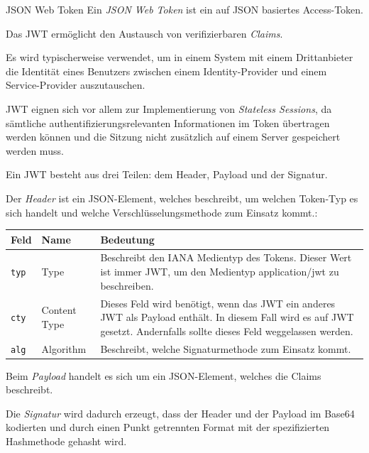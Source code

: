 \begin{defi}{JSON Web Token}
    Ein \emph{JSON Web Token} ist ein auf JSON basiertes Access-Token.

    Das JWT ermöglicht den Austausch von verifizierbaren \emph{Claims}.

    Es wird typischerweise verwendet, um in einem System mit einem Drittanbieter die Identität eines Benutzers zwischen einem Identity-Provider und einem Service-Provider auszutauschen.

    JWT eignen sich vor allem zur Implementierung von \emph{Stateless Sessions}, da sämtliche authentifizierungsrelevanten Informationen im Token übertragen werden können und die Sitzung nicht zusätzlich auf einem Server gespeichert werden muss.

    Ein JWT besteht aus drei Teilen: dem Header, Payload und der Signatur.

    Der \emph{Header} ist ein JSON-Element, welches beschreibt, um welchen Token-Typ es sich handelt und welche Verschlüsselungsmethode zum Einsatz kommt.:

    \begin{tabularx}{\textwidth}{|l|l|X|}
        \hline
        Feld         & Name         & Bedeutung                                                                                                                                                               \\
        \hline
        \hline
        \texttt{typ} & Type         & Beschreibt den IANA Medientyp des Tokens. Dieser Wert ist immer JWT, um den Medientyp application/jwt zu beschreiben.                                                   \\
        \hline
        \texttt{cty} & Content Type & Dieses Feld wird benötigt, wenn das JWT ein anderes JWT als Payload enthält. In diesem Fall wird es auf JWT gesetzt. Andernfalls sollte dieses Feld weggelassen werden. \\
        \hline
        \texttt{alg} & Algorithm    & Beschreibt, welche Signaturmethode zum Einsatz kommt.                                                                                                                   \\
        \hline
    \end{tabularx}

    Beim \emph{Payload} handelt es sich um ein JSON-Element, welches die Claims beschreibt.

    Die \emph{Signatur} wird dadurch erzeugt, dass der Header und der Payload im Base64 kodierten und durch einen Punkt getrennten Format mit der spezifizierten Hashmethode gehasht wird.
\end{defi}


